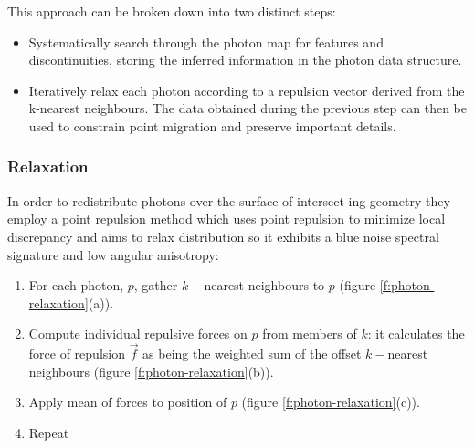 This approach can be broken down into two distinct steps:

\begin{itemize}
	\item Systematically search through the photon map for features and discontinuities, storing the inferred information in the photon data structure.
	\item Iteratively relax each photon according to a repulsion vector derived from the k-nearest neighbours. The data obtained during the previous step can then be used to constrain point migration and preserve important details.
\end{itemize}




\subsubsection{Relaxation}\label{sec:Relaxation}
In order to redistribute photons over the surface of intersect ing geometry they employ a point repulsion method which uses point repulsion to minimize local discrepancy and aims to relax distribution so it exhibits a blue noise spectral signature and low angular anisotropy:

\begin{enumerate}
	\item For each photon, $p$, gather $k-$nearest neighbours to $p$ (figure \ref{f:photon-relaxation}(a)).
	\item Compute individual repulsive forces on $p$ from members of $k$: it calculates the force of repulsion $\vec{f}$ as being the weighted sum of the offset $k-$nearest neighbours (figure \ref{f:photon-relaxation}(b)).
	\item Apply mean of forces to position of $p$ (figure \ref{f:photon-relaxation}(c)).
	\item Repeat
\end{enumerate}

